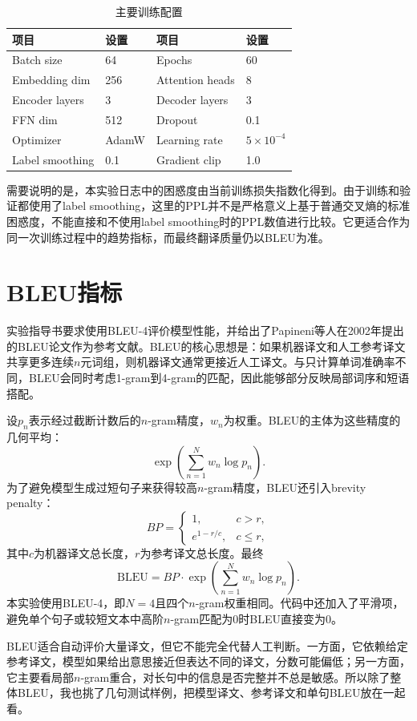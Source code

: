 \documentclass[11pt]{article}
\begin{document}
	\begin{table}[H]
		\centering
		\caption{主要训练配置}
		\small
		\begin{tabular}{M{3cm} M{3cm} M{3cm} M{3cm}}
			\toprule
			项目 & 设置 & 项目 & 设置 \\
			\midrule
			Batch size & 64 & Epochs & 60 \\
			Embedding dim & 256 & Attention heads & 8 \\
			Encoder layers & 3 & Decoder layers & 3 \\
			FFN dim & 512 & Dropout & 0.1 \\
			Optimizer & AdamW & Learning rate & $5\times10^{-4}$ \\
			Label smoothing & 0.1 & Gradient clip & 1.0 \\
			\bottomrule
		\end{tabular}
	\end{table}

	需要说明的是，本实验日志中的困惑度由当前训练损失指数化得到。由于训练和验证都使用了label smoothing，这里的PPL并不是严格意义上基于普通交叉熵的标准困惑度，不能直接和不使用label smoothing时的PPL数值进行比较。它更适合作为同一次训练过程中的趋势指标，而最终翻译质量仍以BLEU为准。

	\section{BLEU指标}
	实验指导书要求使用BLEU-4评价模型性能，并给出了Papineni等人在2002年提出的BLEU论文作为参考文献\cite{papineni2002bleu}。BLEU的核心思想是：如果机器译文和人工参考译文共享更多连续$n$元词组，则机器译文通常更接近人工译文。与只计算单词准确率不同，BLEU会同时考虑1-gram到4-gram的匹配，因此能够部分反映局部词序和短语搭配。

	设$p_n$表示经过截断计数后的$n$-gram精度，$w_n$为权重。BLEU的主体为这些精度的几何平均：
	\[
		\exp\left(\sum_{n=1}^{N}w_n\log p_n\right).
	\]
	为了避免模型生成过短句子来获得较高$n$-gram精度，BLEU还引入brevity penalty：
	\[
		BP=
		\begin{cases}
			1, & c>r,\\
			e^{1-r/c}, & c\le r,
		\end{cases}
	\]
	其中$c$为机器译文总长度，$r$为参考译文总长度。最终
	\[
		\mathrm{BLEU}=BP\cdot
		\exp\left(\sum_{n=1}^{N}w_n\log p_n\right).
	\]
	本实验使用BLEU-4，即$N=4$且四个$n$-gram权重相同。代码中还加入了平滑项，避免单个句子或较短文本中高阶$n$-gram匹配为0时BLEU直接变为0。

	BLEU适合自动评价大量译文，但它不能完全代替人工判断。一方面，它依赖给定参考译文，模型如果给出意思接近但表达不同的译文，分数可能偏低；另一方面，它主要看局部$n$-gram重合，对长句中的信息是否完整并不总是敏感。所以除了整体BLEU，我也挑了几句测试样例，把模型译文、参考译文和单句BLEU放在一起看。
\end{document}
